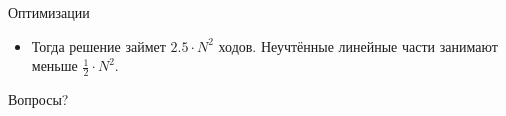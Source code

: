 \begin{frame}[t]{Оптимизации}
    \begin{itemize}
        \item Тогда решение займет $2.5 \cdot N^2$ ходов. Неучтённые линейные части занимают меньше $\frac{1}{2} \cdot N^2$.
    \end{itemize}
\end{frame}


\begin{frame}
  \begin{center}
    {\LARGE Вопросы?}
  \end{center}
\end{frame}
